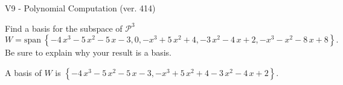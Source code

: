\begin{exercise}
  \begin{exerciseTitle}V9 - Polynomial Computation (ver. 414)\end{exerciseTitle}
  \begin{exerciseStatement}
    Find a basis for the subspace of \(\mathcal{P}^3\) 
\[W=\mathrm{span}\ \left\{-4 \, x^{3} - 5 \, x^{2} - 5 \, x - 3 , 0 , -x^{3} + 5 \, x^{2} + 4 , -3 \, x^{2} - 4 \, x + 2 , -x^{3} - x^{2} - 8 \, x + 8\right\}.\]
 Be sure to explain why your result is a basis.


  \end{exerciseStatement}
  \begin{exerciseAnswer}
   A basis of \(W\) is  \(\left\{-4 \, x^{3} - 5 \, x^{2} - 5 \, x - 3 , -x^{3} + 5 \, x^{2} + 4 -3 \, x^{2} - 4 \, x + 2\right\}\).
  


  \end{exerciseAnswer}
\end{exercise}